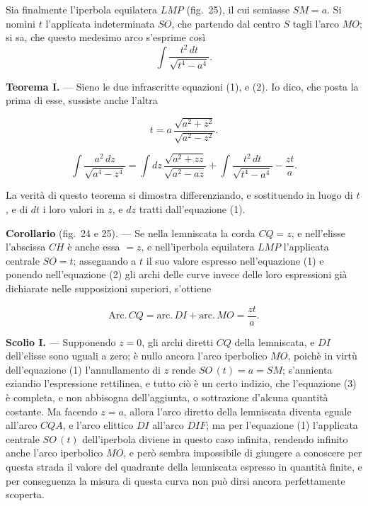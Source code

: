 \documentclass{article}
\begin{document}
Sia finalmente l'iperbola equilatera $LMP$ (fig.~25), il cui semiasse $SM = a$. Si nomini
$t$ l'applicata indeterminata $SO$, che partendo dal centro $S$ tagli l'arco $MO$; si sa,
che questo medesimo arco s'esprime così
\[ \int \frac{t^{2}\,dt}{\sqrt{t^{4} - a^{4}}}. \]


\textbf{Teorema I.} --- Sieno le due infrascritte equazioni (1), e (2). Io dico, che posta
la prima di esse, sussiste anche l'altra

\[ t = a\, \frac{\sqrt{a^{2} + z^{2}}}{\sqrt{a^{2} - z^{2}}}. \tag{1} \]

\[ \int \frac{a^{2}\,dz}{\sqrt{a^{4} - z^{4}}} = \int dz\, \frac{\sqrt{a^{2} + zz}}{\sqrt{a^{2} - az}} + \int \frac{t^{2}\,dt}{\sqrt{t^{4} - a^{4}}} - \frac{zt}{a}. \tag{2} \]

La verità di questo teorema si dimostra differenziando, e sostituendo in luogo di $t$, e di
$dt$ i loro valori in $z$, e $dz$ tratti dall'equazione (1).

\textbf{Corollario} (fig.~24 e 25). --- Se nella lemniscata la corda $CQ = z$, e nell'elisse
l'abscissa $CH$ è anche essa $= z$, e nell'iperbola equilatera $LMP$ l'applicata centrale
$SO = t$; assegnando a $t$ il suo valore espresso nell'equazione (1) e ponendo nell'equazione
(2) gli archi delle curve invece delle loro espressioni già dichiarate nelle supposizioni
superiori, s'ottiene

\[ \mathrm{Arc.}\,CQ = \mathrm{arc.}\,DI + \mathrm{arc.}\,MO = \frac{zt}{a}. \tag{3} \]

\textbf{Scolio I.} --- Supponendo $z = 0$, gli archi diretti $CQ$ della lemniscata, e $DI$
dell'elisse sono uguali a zero; è nullo ancora l'arco iperbolico $MO$, poichè in virtù
dell'equazione (1) l'annullamento di $z$ rende $SO\,(t) = a = SM$; s'annienta eziandio
l'espressione rettilinea, e tutto ciò è un certo indizio, che l'equazione (3) è completa, e
non abbisogna dell'aggiunta, o sottrazione d'alcuna quantità costante. Ma facendo $z = a$,
allora l'arco diretto della lemniscata diventa eguale all'arco $CQA$, e l'arco elittico $DI$
all'arco $DIF$; ma per l'equazione (1) l'applicata centrale $SO\,(t)$ dell'iperbola diviene
in questo caso infinita, rendendo infinito anche l'arco iperbolico $MO$, e però sembra
impossibile di giungere a conoscere per questa strada il
valore del quadrante della lemniscata espresso in quantità finite, e per conseguenza la
misura di questa curva non può dirsi ancora perfettamente scoperta.
\end{document}
